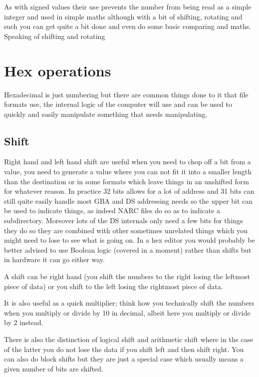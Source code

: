 \documentclass[
]{book}
\begin{document}
As with signed values their use prevents the number from being read as a simple integer and used in simple maths although with a bit of shifting, rotating and such you can get quite a bit done and even do some basic comparing and maths. Speaking of shifting and rotating

\hypertarget{hex-operations}{%
\section{Hex operations}\label{hex-operations}}

Hexadecimal is just numbering but there are common things done to it that file formats use, the internal logic of the computer will use and can be used to quickly and easily manipulate something that needs manipulating.

\hypertarget{shift}{%
\subsection{Shift}\label{shift}}

Right hand and left hand shift are useful when you need to chop off a bit from a value, you need to generate a value where you can not fit it into a smaller length than the destination or in some formats which leave things in an unshifted form for whatever reason. In practice 32 bits allows for a lot of address and 31 bits can still quite easily handle most GBA and DS addressing needs so the upper bit can be used to indicate things, as indeed NARC files do so as to indicate a subdirectory. Moreover lots of the DS internals only need a few bits for things they do so they are combined with other sometimes unrelated things which you might need to lose to see what is going on. In a hex editor you would probably be better advised to use Boolean logic (covered in a moment) rather than shifts but in hardware it can go either way.

A shift can be right hand (you shift the numbers to the right losing the leftmost piece of data) or you shift to the left losing the rightmost piece of data.

It is also useful as a quick multiplier; think how you technically shift the numbers when you multiply or divide by 10 in decimal, albeit here you multiply or divide by 2 instead.

There is also the distinction of logical shift and arithmetic shift where in the case of the latter you do not lose the data if you shift left and then shift right. You can also do block shifts but they are just a special case which usually means a given number of bits are shifted.
\end{document}
